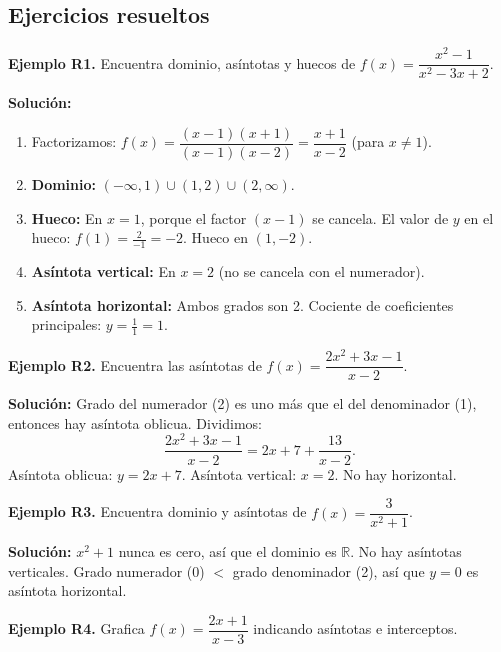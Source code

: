 \documentclass[12pt, letterpaper]{article}
\begin{document}
\newpage

\subsection{Ejercicios resueltos}

\textbf{Ejemplo R1.} Encuentra dominio, asíntotas y huecos de $f(x) = \dfrac{x^2 - 1}{x^2 - 3x + 2}$.

\begin{cuadrosolucion}
  \textbf{Solución:}
  \begin{enumerate}
    \item Factorizamos: $f(x) = \dfrac{(x - 1)(x + 1)}{(x - 1)(x - 2)} = \dfrac{x + 1}{x - 2}$ (para $x \neq 1$).
    \item \textbf{Dominio:} $(-\infty, 1) \cup (1, 2) \cup (2, \infty)$.
    \item \textbf{Hueco:} En $x = 1$, porque el factor $(x - 1)$ se cancela. El valor de $y$ en el hueco: $f(1) = \frac{2}{-1} = -2$. Hueco en $(1, -2)$.
    \item \textbf{Asíntota vertical:} En $x = 2$ (no se cancela con el numerador).
    \item \textbf{Asíntota horizontal:} Ambos grados son 2. Cociente de coeficientes principales: $y = \frac{1}{1} = 1$.
  \end{enumerate}
\end{cuadrosolucion}

\textbf{Ejemplo R2.} Encuentra las asíntotas de $f(x) = \dfrac{2x^2 + 3x - 1}{x - 2}$.

\begin{cuadrosolucion}
  \textbf{Solución:} Grado del numerador (2) es uno más que el del denominador (1), entonces hay asíntota oblicua. Dividimos:
  $$\dfrac{2x^2 + 3x - 1}{x - 2} = 2x + 7 + \dfrac{13}{x - 2}.$$
  Asíntota oblicua: $y = 2x + 7$. Asíntota vertical: $x = 2$. No hay horizontal.
\end{cuadrosolucion}

\textbf{Ejemplo R3.} Encuentra dominio y asíntotas de $f(x) = \dfrac{3}{x^2 + 1}$.

\begin{cuadrosolucion}
  \textbf{Solución:} $x^2 + 1$ nunca es cero, así que el dominio es $\mathbb{R}$. No hay asíntotas verticales. Grado numerador (0) $<$ grado denominador (2), así que $y = 0$ es asíntota horizontal.
\end{cuadrosolucion}

\newpage

\textbf{Ejemplo R4.} Grafica $f(x) = \dfrac{2x + 1}{x - 3}$ indicando asíntotas e interceptos.
\end{document}
